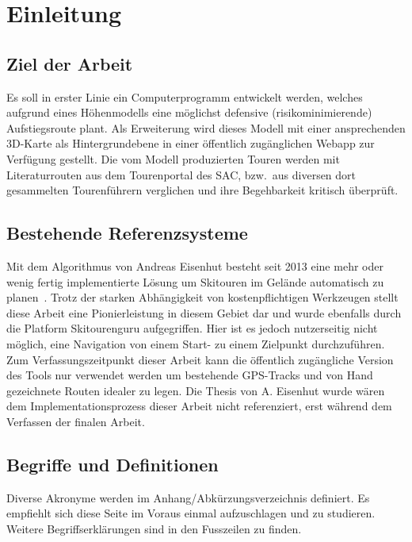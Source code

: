 
\section{Einleitung}

\subsection{Ziel der Arbeit}

Es soll in erster Linie ein Computerprogramm entwickelt werden, welches aufgrund eines Höhenmodells eine möglichst defensive (risikominimierende) Aufstiegsroute plant. Als Erweiterung wird dieses Modell mit einer ansprechenden 3D-Karte als Hintergrundebene in einer öffentlich zugänglichen Webapp zur Verfügung gestellt. Die vom Modell produzierten Touren werden mit Literaturrouten aus dem Tourenportal des SAC, bzw.\ aus diversen dort gesammelten Tourenführern verglichen und ihre Begehbarkeit kritisch überprüft.

\subsection{Bestehende Referenzsysteme}

Mit dem Algorithmus von Andreas Eisenhut besteht seit 2013 eine mehr oder wenig fertig implementierte Lösung um Skitouren im Gelände automatisch zu planen\ \cite{eisenhuttourknopfdruck}. Trotz der starken Abhängigkeit von kostenpflichtigen Werkzeugen stellt diese Arbeit eine Pionierleistung in diesem Gebiet dar und wurde ebenfalls durch die Platform Skitourenguru aufgegriffen. Hier ist es jedoch nutzerseitig nicht möglich, eine Navigation von einem Start- zu einem Zielpunkt durchzuführen. Zum Verfassungszeitpunkt dieser Arbeit kann die öffentlich zugängliche Version des Tools nur verwendet werden um bestehende GPS-Tracks und von Hand gezeichnete Routen idealer zu legen. Die Thesis von A. Eisenhut wurde wären dem Implementationsprozess dieser Arbeit nicht referenziert, erst während dem Verfassen der finalen Arbeit.

\subsection{Begriffe und Definitionen}

Diverse Akronyme werden im Anhang/Abkürzungsverzeichnis definiert. Es empfiehlt sich diese Seite im Voraus einmal aufzuschlagen und zu studieren. Weitere Begriffserklärungen sind in den Fusszeilen zu finden.

